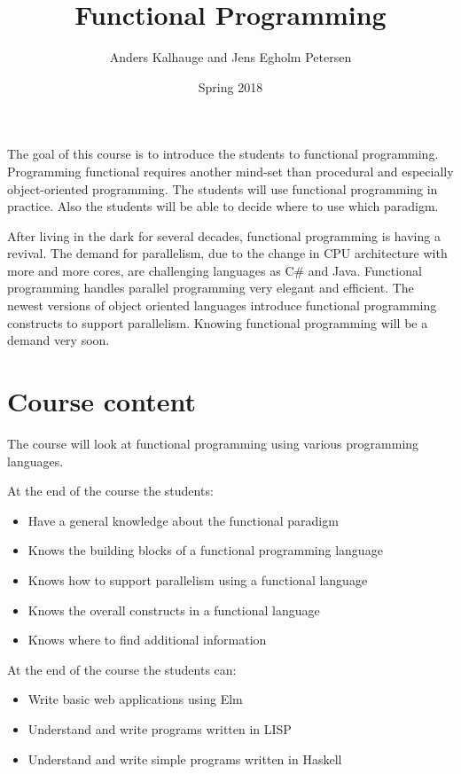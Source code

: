 \documentclass[12pt,a4paper,final]{article}
\title{Functional Programming}
\author{Anders Kalhauge and Jens Egholm Petersen}
\date{Spring 2018}
\begin{document}
\maketitle

The goal of this course is to introduce the students to functional programming. Programming functional requires another mind-set than procedural and especially object-oriented programming. The students will use functional programming in practice. Also the students will be able to decide where to use which paradigm.

After living in the dark for several decades, functional programming is having a revival. The demand for parallelism, due to the change in CPU architecture with more and more cores, are challenging languages as C\# and Java. Functional programming handles parallel programming very elegant and efficient. The newest versions of object oriented languages introduce functional programming constructs to support parallelism. Knowing functional programming will be a demand very soon.

\section*{Course content}

The course will look at functional programming using various programming languages.

At the end of the course the students:

\begin{itemize}
	\item Have a general knowledge about the functional paradigm
	\item Knows the building blocks of a functional programming language
	\item Knows how to support parallelism using a functional language
	\item Knows the overall constructs in a functional language
  \item Knows where to find additional information
\end{itemize}

At the end of the course the students can:

\begin{itemize}
	\item Write basic web applications using Elm
	\item Understand and write programs written in LISP
  \item Understand and write simple programs written in Haskell
\end{itemize}
\end{document}
